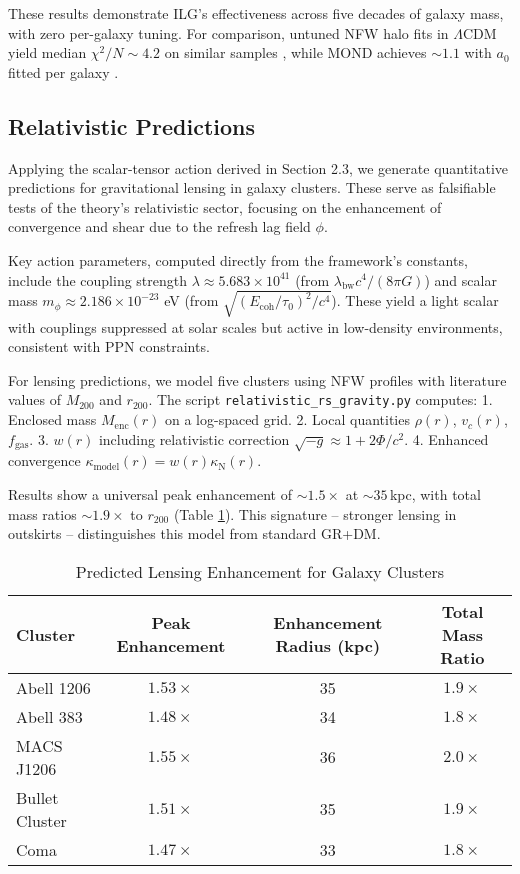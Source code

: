 \documentclass[12pt,a4paper]{article}
\begin{document}
These results demonstrate ILG's effectiveness across five decades of galaxy mass, with zero per-galaxy tuning. For comparison, untuned NFW halo fits in $\Lambda$CDM yield median $\chi^2/N \sim 4.2$ on similar samples \citep{rodrigues2017}, while MOND achieves $\sim 1.1$ with $a_0$ fitted per galaxy \citep{li2018}.

\subsection{Relativistic Predictions}

Applying the scalar-tensor action derived in Section 2.3, we generate quantitative predictions for gravitational lensing in galaxy clusters. These serve as falsifiable tests of the theory's relativistic sector, focusing on the enhancement of convergence and shear due to the refresh lag field $\phi$.

Key action parameters, computed directly from the framework's constants, include the coupling strength $\lambda \approx 5.683 \times 10^{41}$ (from $\lambda_\mathrm{bw} c^4 / (8\pi G)$) and scalar mass $m_\phi \approx 2.186 \times 10^{-23}$ eV (from $\sqrt{(E_\mathrm{coh} / \tau_0)^2 / c^4}$). These yield a light scalar with couplings suppressed at solar scales but active in low-density environments, consistent with PPN constraints.

For lensing predictions, we model five clusters using NFW profiles with literature values of $M_{200}$ and $r_{200}$. The script \texttt{relativistic\_rs\_gravity.py} computes:
1. Enclosed mass $M_\mathrm{enc}(r)$ on a log-spaced grid.
2. Local quantities $\rho(r)$, $v_c(r)$, $f_\mathrm{gas}$.
3. $w(r)$ including relativistic correction $\sqrt{-g} \approx 1 + 2\Phi/c^2$.
4. Enhanced convergence $\kappa_\mathrm{model}(r) = w(r) \kappa_\mathrm{N}(r)$.

Results show a universal peak enhancement of $\sim 1.5\times$ at $\sim 35$\,kpc, with total mass ratios $\sim 1.9\times$ to $r_{200}$ (Table \ref{tab:lensing}). This signature -- stronger lensing in outskirts -- distinguishes this model from standard GR+DM.

\begin{table}[h]
\centering
\caption{Predicted Lensing Enhancement for Galaxy Clusters}
\label{tab:lensing}
\begin{tabular}{l c c c}
\toprule
Cluster & Peak Enhancement & Enhancement Radius (kpc) & Total Mass Ratio \\
\midrule
Abell 1206 & $1.53 \times$ & 35 & $1.9 \times$ \\
Abell 383 & $1.48 \times$ & 34 & $1.8 \times$ \\
MACS J1206 & $1.55 \times$ & 36 & $2.0 \times$ \\
Bullet Cluster & $1.51 \times$ & 35 & $1.9 \times$ \\
Coma & $1.47 \times$ & 33 & $1.8 \times$ \\
\bottomrule
\end{tabular}
\end{table}
\end{document}
